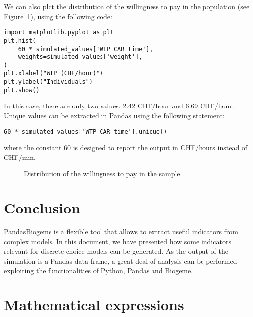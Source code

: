 \documentclass[12pt,a4paper]{article}
\begin{document}
We can also plot the distribution of the willingness to pay in the
population (see Figure~\ref{fig:wtp}), using the following code:
\begin{lstlisting}
import matplotlib.pyplot as plt
plt.hist(
    60 * simulated_values['WTP CAR time'],
    weights=simulated_values['weight'],
)
plt.xlabel("WTP (CHF/hour)")
plt.ylabel("Individuals")
plt.show()
\end{lstlisting}
In this case, there are only two values: 2.42 CHF/hour and 6.69
CHF/hour. Unique values can be extracted in Pandas using the following
statement:
\begin{lstlisting}
60 * simulated_values['WTP CAR time'].unique()
\end{lstlisting}
where the constant 60 is designed to report the output in CHF/hours
instead of CHF/min.
\begin{figure}[htb]
\begin{center}

\end{center}
\caption{\label{fig:wtp}Distribution of the willingness to pay in the sample}
\end{figure}
\section{Conclusion}

PandasBiogeme is a flexible tool that allows to extract useful
indicators from complex models. In this document, we have presented
how some indicators relevant for discrete choice models  can be
generated. As the output of the simulation is a Pandas data frame, a
great deal of analysis can be performed exploiting the functionalities of
Python, Pandas and Biogeme.

\clearpage

\appendix

\section{Mathematical expressions}\label{sec:expressions}

\renewcommand{\arraystretch}{1.2}
\end{document}
